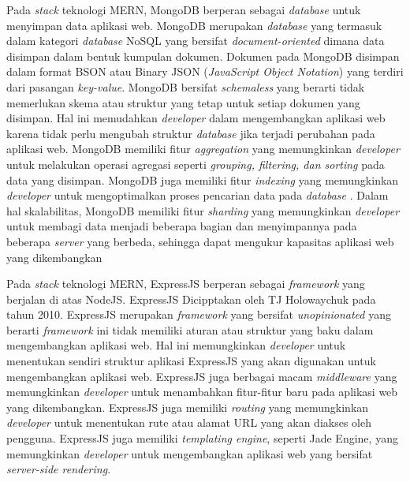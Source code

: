 Pada \textit{stack} teknologi MERN, MongoDB berperan sebagai \textit{database} untuk 
menyimpan data aplikasi web. MongoDB merupakan \textit{database} yang termasuk dalam kategori 
\textit{database} NoSQL yang bersifat \textit{document-oriented} dimana data disimpan dalam
bentuk kumpulan dokumen. Dokumen pada MongoDB disimpan dalam format BSON atau Binary JSON (\textit{JavaScript Object Notation})
yang terdiri dari pasangan \textit{key-value}. MongoDB bersifat \textit{schemaless} yang berarti
tidak memerlukan skema atau struktur yang tetap untuk setiap dokumen yang disimpan. 
Hal ini memudahkan \textit{developer} dalam mengembangkan aplikasi web karena tidak perlu
mengubah struktur \textit{database} jika terjadi perubahan pada aplikasi web. 
MongoDB memiliki fitur \textit{aggregation} yang memungkinkan \textit{developer} untuk
melakukan operasi agregasi seperti \textit{grouping, filtering, dan sorting} pada data yang
disimpan. MongoDB juga memiliki fitur \textit{indexing} yang memungkinkan \textit{developer} untuk
mengoptimalkan proses pencarian data pada \textit{database} \cite{boicea_mongodb_2012}. 
Dalam hal skalabilitas, MongoDB memiliki fitur \textit{sharding} yang memungkinkan \textit{developer} untuk 
membagi data menjadi beberapa bagian dan menyimpannya pada beberapa \textit{server} yang berbeda, 
sehingga dapat mengukur kapasitas aplikasi web yang dikembangkan\cite{kookarinrat_analysis_2015}

Pada \textit{stack} teknologi MERN, ExpressJS berperan sebagai \textit{framework} yang berjalan di atas NodeJS. 
ExpressJS Dicipptakan oleh TJ Holowaychuk pada tahun 2010\cite{vu_building_2020}. ExpressJS merupakan \textit{framework} yang 
bersifat \textit{unopinionated} yang berarti \textit{framework} ini tidak memiliki aturan atau struktur yang 
baku dalam mengembangkan aplikasi web\cite{lakshmi_website_2023}. Hal ini memungkinkan \textit{developer} untuk menentukan sendiri 
struktur aplikasi ExpressJS yang akan digunakan untuk mengembangkan aplikasi web. 
ExpressJS juga berbagai macam \textit{middleware} yang memungkinkan \textit{developer} 
untuk menambahkan fitur-fitur baru pada aplikasi web yang dikembangkan. ExpressJS juga memiliki 
\textit{routing} yang memungkinkan \textit{developer} untuk menentukan rute atau alamat URL yang akan 
diakses oleh pengguna. ExpressJS juga memiliki \textit{templating engine}, seperti Jade Engine, yang memungkinkan \textit{developer} 
untuk mengembangkan aplikasi web yang bersifat \textit{server-side rendering}\cite{jiang_architecture_2015}.

